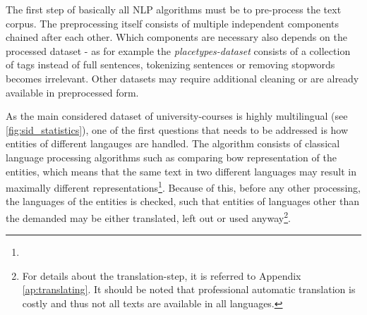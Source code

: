 The first step of basically all NLP algorithms must be to pre-process the text corpus. The preprocessing itself consists of multiple independent components chained after each other. Which components are necessary also depends on the processed dataset - as for example the \emph{placetypes-dataset} consists of a collection of tags instead of full sentences, tokenizing sentences or removing \glspl{stopword} becomes irrelevant. Other datasets may require additional cleaning or are already available in preprocessed form.

As the main considered dataset of university-courses is highly multilingual (see \autoref{fig:sid_statistics}), one of the first questions that needs to be addressed is how entities of different langauges are handled. The algorithm consists of classical language processing algorithms such as comparing \gls{bow} representation of the entities, which means that the same text in two different languages may result in maximally different representations\footnote{}. Because of this, before any other processing, the languages of the entities is checked, such that entities of languages other than the demanded may be either translated, left out or used anyway\footnote{For details about the translation-step, it is referred to Appendix \ref{ap:translating}. It should be noted that professional automatic translation is costly and thus not all texts are available in all languages.}.


